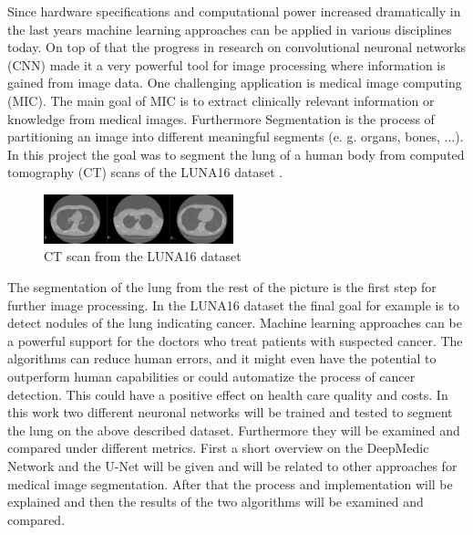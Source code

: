 
Since hardware specifications and computational power increased dramatically in the last years machine learning approaches can be applied in various disciplines today. On top of that the progress in research on convolutional neuronal networks (CNN) made it a very powerful tool for image processing where information is gained from image data.\newline
One challenging application is medical image computing (MIC). The main goal of MIC is to extract clinically relevant information or knowledge from medical images. Furthermore Segmentation is the process of partitioning an image into different meaningful segments (e. g. organs, bones, ...).\newline
In this project the goal was to segment the lung of a human body from computed tomography (CT) scans of the LUNA16 dataset \cite{luna}.\newline

\begin{figure}[h!]
	\includegraphics[width=0.49\textwidth, angle=0]{files/ctscans.jpg}
	\caption{CT scan from the LUNA16 dataset}
	\label{scan_picture}
\end{figure}

The segmentation of the lung from the rest of the picture is the first step for further image processing. In the LUNA16 dataset the final goal for example is to detect nodules of the lung indicating cancer. Machine learning approaches can be a powerful support for the doctors who treat patients with suspected cancer. The algorithms can reduce human errors, and it might even have the potential to outperform human capabilities or could automatize the process of cancer detection. This could have a positive effect on health care quality and costs.\newline
In this work two different neuronal networks will be trained and tested to segment the lung on the above described dataset. Furthermore they will be examined and compared under different metrics.\newline
First a short overview on the DeepMedic Network and the U-Net will be given and will be related to other approaches for medical image segmentation. After that the process and implementation will be explained and then the results of the two algorithms will be examined and compared.
